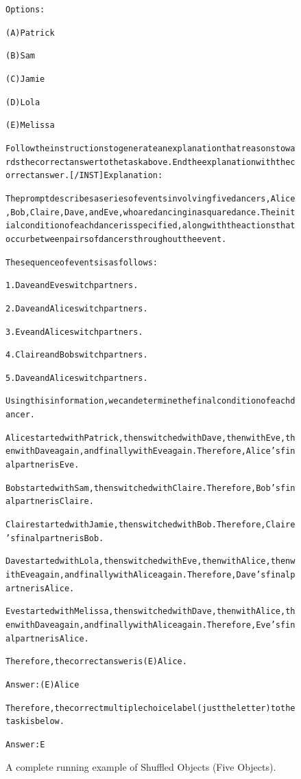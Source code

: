 \begin{figure}[t]
{{\begin{alltt}
Options:

(A) Patrick

(B) Sam

(C) Jamie

(D) Lola

(E) Melissa

Follow the instructions to generate an explanation that reasons towards the correct answer to the task above. End the explanation with the correct answer. [/INST] Explanation: 

The prompt describes a series of events involving five dancers, Alice, Bob, Claire, Dave, and Eve, who are dancing in a square dance. The initial condition of each dancer is specified, along with the actions that occur between pairs of dancers throughout the event.

The sequence of events is as follows:

1. Dave and Eve switch partners.

2. Dave and Alice switch partners.

3. Eve and Alice switch partners.

4. Claire and Bob switch partners.

5. Dave and Alice switch partners.

Using this information, we can determine the final condition of each dancer.

Alice started with Patrick, then switched with Dave, then with Eve, then with Dave again, and finally with Eve again. Therefore, Alice's final partner is Eve.

Bob started with Sam, then switched with Claire. Therefore, Bob's final partner is Claire.

Claire started with Jamie, then switched with Bob. Therefore, Claire's final partner is Bob.

Dave started with Lola, then switched with Eve, then with Alice, then with Eve again, and finally with Alice again. Therefore, Dave's final partner is Alice.

Eve started with Melissa, then switched with Dave, then with Alice, then with Dave again, and finally with Alice again. Therefore, Eve's final partner is Alice.

Therefore, the correct answer is (E) Alice.

Answer: (E) Alice

Therefore, the correct multiple choice label (just the letter) to the task is below.

Answer: E
\end{alltt}
}}
\caption{A complete running example of Shuffled Objects (Five Objects).}
\label{fig:shuffled_objects=five_objects_example}
\end{figure}
